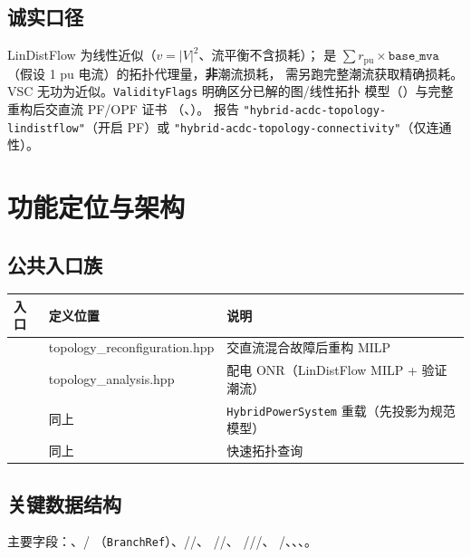 \documentclass[UTF8,fontset=fandol,a4paper,11pt]{ctexart}
\begin{document}
\subsection{诚实口径}
LinDistFlow 为线性近似（$v=|V|^2$、流平衡不含损耗）； 是
$\sum r_{\text{pu}}\times\texttt{base\_mva}$（假设 1 pu 电流）的拓扑代理量，\textbf{非}潮流损耗，
需另跑完整潮流获取精确损耗。VSC 无功为近似。\texttt{ValidityFlags} 明确区分已解的图/线性拓扑
模型（）与完整重构后交直流 PF/OPF 证书
（、）。
报告 \texttt{"hybrid-acdc-topology-lindistflow"}（开启 PF）或
\texttt{"hybrid-acdc-topology-connectivity"}（仅连通性）。

\section{功能定位与架构}
\subsection{公共入口族}
\begin{center}\footnotesize
\begin{tabular}{@{}L{6.6cm}L{3.2cm}L{5.2cm}@{}}
\toprule
入口 & 定义位置 & 说明\\
\midrule
{} & topology\_reconfiguration.hpp & 交直流混合故障后重构 MILP\\
 & topology\_analysis.hpp & 配电 ONR（LinDistFlow MILP + 验证潮流）\\
 & 同上 & \texttt{HybridPowerSystem} 重载（先投影为规范模型）\\
 & 同上 & 快速拓扑查询\\
\bottomrule
\end{tabular}
\end{center}

\subsection{关键数据结构}
主要字段：、/
（\texttt{BranchRef}）、//、
//、
///、
/、、、。
\end{document}
